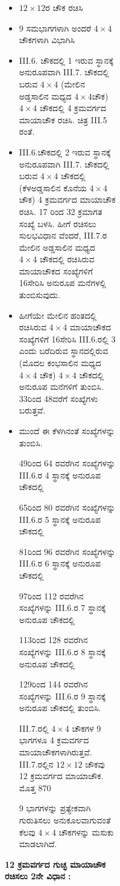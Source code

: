 \begin{figure}[H]
\begin{figure}[H]
\begin{figure}[h]
\begin{figure}[h]
\begin{itemize}
	\item $12 \times 12$ರ ಚೌಕ ರಚಿಸಿ
	\item 9 ಸಮಭಾಗಗಳಾಗಿ ಅಂದರೆ $4 \times 4$ಚೌಕಗಳಾಗಿ ವಿಭಾಗಿಸಿ
	\item  III.6. ಚೌಕದಲ್ಲಿ 1 ಇರುವ ಸ್ಥಾನಕ್ಕೆ ಅನುರೂಪವಾಗಿ  III.7. ಚೌಕದಲ್ಲಿ ಬರುವ $4 \times 4$ (ಮೇಲಿನ ಅಡ್ಡಸಾಲಿನ ಮಧ್ಯದ $4 \times 4$ಚೌಕ) $4 \times 4$ ಚೌಕದಲ್ಲಿ 4 ಕ್ರಮವರ್ಗದ ಮಾಯಾಚೌಕ ರಚಿಸಿ. ಚಿತ್ರ  III.5 ರಂತೆ.
	\item  III.6.ಚೌಕದಲ್ಲಿ 2 ಇರುವ ಸ್ಥಾನಕ್ಕೆ ಅನುರೂಪವಾಗಿ  III.7. ಚೌಕದಲ್ಲಿ ಬರುವ $4 \times 4$ ಚೌಕದಲ್ಲಿ (ಕೆಳಅಡ್ಡಸಾಲಿನ ಕೊನೆಯ $4 \times 4$ ಚೌಕ) 4 ಕ್ರಮವರ್ಗದ ಮಾಯಾಚೌಕ 
	ರಚಿಸಿ. 17 ರಿಂದ 32 ಕ್ರಮಾಗತ ಸಂಖ್ಯೆ ಬಳಸಿ. ಹೀಗೆ ರಚಿಸಲು ಸುಲಭವಿಧಾನ ವೆಂದರೆ,  III.7.ರ ಮೇಲಿನ ಅಡ್ಡಸಾಲಿನ ಮಧ್ಯದ $4 \times 4$ ಚೌಕದಲ್ಲಿ ರಚಿಸಿರುವ ಮಾಯಾಚೌಕದ ಸಂಖ್ಯೆಗಳಿಗೆ 16ಸೇರಿಸಿ ಅನುರೂಪ ಮನೆಗಳಲ್ಲಿ ತುಂಬಿಸುವುದು.
	\item ಹೀಗೆಯೇ ಮೇಲಿನ ಹಂತದಲ್ಲಿ ರಚಿಸಿರುವ $4 \times 4$ ಮಾಯಾಚೌಕದ ಸಂಖ್ಯೆಗಳಿಗೆ 16ಸೇರಿಸಿ  III.6.ರಲ್ಲಿ 3 ಎಂದು ಬರೆದಿರುವ ಸ್ಥಾನದಲ್ಲಿರುವ (ಮೊದಲ ಕಂಭಸಾಲಿನ ಮಧ್ಯದ $4 \times 4$ ಚೌಕ) $4 \times 4$ ಚೌಕದಲ್ಲಿ ಅನುರೂಪ ಮನೆಗಳಿಗೆ ತುಂಬಿಸಿ. 33ರಿಂದ 48ವರೆಗೆ ಸಂಖ್ಯೆಗಳು ಬರುತ್ತವೆ.
	\item ಮುಂದೆ ಈ ಕೆಳಗಿನಂತೆ ಸಂಖ್ಯೆಗಳನ್ನು ತುಂಬಿಸಿ.

	49ರಿಂದ 64 ರವರೆಗಿನ ಸಂಖ್ಯೆಗಳನ್ನು  III.6.ರ 4 ಸ್ಥಾನಕ್ಕೆ ಅನುರೂಪ ಚೌಕದಲ್ಲಿ

	65ರಿಂದ 80 ರವರೆಗಿನ ಸಂಖ್ಯೆಗಳನ್ನು  III.6.ರ 5 ಸ್ಥಾನಕ್ಕೆ ಅನುರೂಪ ಚೌಕದಲ್ಲಿ

	81ರಿಂದ 96 ರವರೆಗಿನ ಸಂಖ್ಯೆಗಳನ್ನು  III.6.ರ 6 ಸ್ಥಾನಕ್ಕೆ ಅನುರೂಪ ಚೌಕದಲ್ಲಿ

	97ರಿಂದ 112 ರವರೆಗಿನ ಸಂಖ್ಯೆಗಳನ್ನು  III.6.ರ 7 ಸ್ಥಾನಕ್ಕೆ ಅನುರೂಪ ಚೌಕದಲ್ಲಿ

	113ರಿಂದ 128 ರವರೆಗಿನ ಸಂಖ್ಯೆಗಳನ್ನು  III.6.ರ 8 ಸ್ಥಾನಕ್ಕೆ ಅನುರೂಪ ಚೌಕದಲ್ಲಿ

	129ರಿಂದ 144 ರವರೆಗಿನ ಸಂಖ್ಯೆಗಳನ್ನು  III.6.ರ 9 ಸ್ಥಾನಕ್ಕೆ ಅನುರೂಪ ಚೌಕದಲ್ಲಿ ತುಂಬಿಸಿ.

\newpage

	III.7.ರಲ್ಲಿ $4 \times 4$ ಚೌಕಗಳ 9 ಭಾಗಗಳೂ 4 ಕ್ರಮವರ್ಗದ ಮಾಯಾಚೌಕಗಳಾಗಿ\-ರುತ್ತವೆ.  III.7.ರಲ್ಲಿನ $12 \times 12$ ಚೌಕವು 12 ಕ್ರಮವರ್ಗದ ಮಾಯಾಚೌಕ. ಮೊತ್ತ 870

	9 ಭಾಗಗಳನ್ನು ಪ್ರತ್ಯೇಕವಾಗಿ ಗುರುತಿಸಲು ಅನುಕೂಲವಾಗುವಂತೆ ಕೆಲವು $4 \times 4$ ಚೌಕಗಳನ್ನು ಮಸುಕು ಮಾಡಲಾಗಿದೆ.
\end{itemize}

\smallskip
\textbf{12 ಕ್ರಮವರ್ಗದ ಗುಚ್ಛ ಮಾಯಾಚೌಕ ರಚಿಸಲು 2ನೇ ವಿಧಾನ :}
\smallskip


\end{figure}
\end{figure}
\end{figure}
\end{figure}
